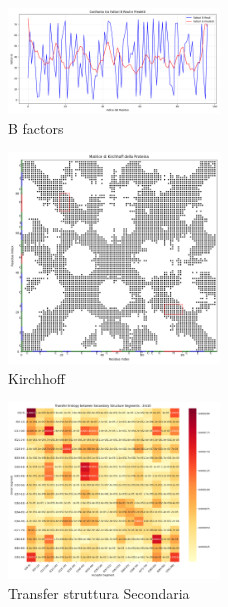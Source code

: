 \documentclass{article}
\begin{document}
\begin{figure}[H]
    \centering
    \includegraphics[width=0.5\textwidth]{"images/2m10Confronto tra Fattori B Reali e Predetti.png"}
    \caption{B factors}
\end{figure}
\begin{figure}[H]
    \centering
    \includegraphics[width=0.5\textwidth]{"images/2m10_Matrice di Kirchhoff della Proteina.png"}
    \caption{Kirchhoff}
\end{figure}
\begin{figure}[H]
    \centering
    \includegraphics[width=0.5\textwidth]{"images/2m10analyze_secondary_structure_transfer_entropy.png"}
    \caption{Transfer struttura Secondaria}
\end{figure}
\end{document}
